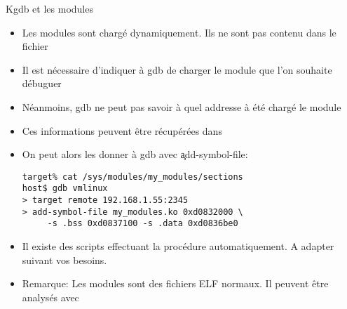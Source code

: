 \begin{frame}[fragile=singleslide]{Kgdb et les modules}
  \begin{itemize}
  \item Les modules sont chargé dynamiquement. Ils ne sont pas contenu
    dans le fichier 
  \item Il  est nécessaire d'indiquer à  gdb de charger  le module que
    l'on souhaite débuguer
  \item Néanmoins, gdb ne peut pas savoir à quel addresse à été chargé
    le module
  \item    Ces    informations    peuvent   être    récupérées    dans
  \item On peut alors les donner à gdb avec \c{add-symbol-file}:
    \begin{lstlisting}
target% cat /sys/modules/my_modules/sections
host$ gdb vmlinux
> target remote 192.168.1.55:2345
> add-symbol-file my_modules.ko 0xd0832000 \
     -s .bss 0xd0837100 -s .data 0xd0836be0
    \end{lstlisting}
  \item    Il   existe   des    scripts   effectuant    la   procédure
    automatiquement. A adapter suivant vos besoins.
  \item  Remarque:  Les modules  sont  des  fichiers  ELF normaux.  Il
    peuvent être analysés avec \cmd{objdump}
  \end{itemize}
\end{frame}




